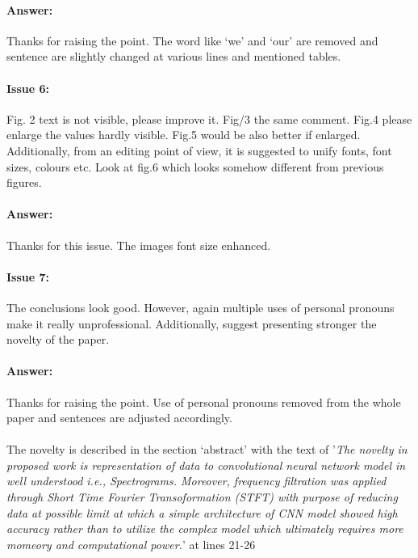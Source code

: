 \documentclass{article}
\begin{document}
\paragraph{Answer:}
Thanks for raising the point. The word like `we' and `our' are removed and sentence are slightly changed at various lines and mentioned tables. 

\paragraph{Issue 6:}
\begin{displayquote}
Fig. 2 text is not visible, please improve it.  Fig/3 the same comment. Fig.4 please enlarge the values hardly visible. Fig.5 would be also better if enlarged. Additionally, from an editing point of view, it is suggested to unify fonts, font sizes, colours etc. Look at fig.6 which looks somehow different from previous figures.
\end{displayquote}

\paragraph{Answer:}
Thanks for this issue. The images font size enhanced.

\paragraph{Issue 7:}
\begin{displayquote}
The conclusions look good. However, again multiple uses of personal pronouns make it really unprofessional. Additionally, suggest presenting stronger the novelty of the paper.

\end{displayquote}

\paragraph{Answer:}
Thanks for raising the point. Use of personal pronouns removed from the whole paper and sentences are adjusted accordingly. \\\\

The novelty is described in the section `abstract' with the text of '\textit{The novelty in proposed work is representation of data to convolutional neural network model in well understood i.e., Spectrograms. Moreover, frequency filtration was applied through Short Time Fourier Transoformation (STFT) with purpose of reducing data at possible limit at which a simple architecture of CNN model showed high accuracy rather than to utilize the complex model which ultimately requires more momeory and computational power.}' at lines 21-26 
\end{document}
